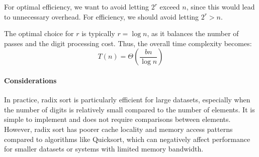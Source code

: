 For optimal efficiency, we want to avoid letting $2^r$ exceed $n$, since this would lead to unnecessary overhead.
For efficiency, we should avoid letting $2^r>n$.

The optimal choice for $r$ is typically $r=\log n$, as it balances the number of passes and the digit processing cost.
Thus, the overall time complexity becomes:
\[T(n)=\Theta\left(\dfrac{bn}{\log n}\right)\]

\paragraph*{Considerations}
In practice, radix sort is particularly efficient for large datasets, especially when the number of digits is relatively small compared to the number of elements. 
It is simple to implement and does not require comparisons between elements. 
However, radix sort has poorer cache locality and memory access patterns compared to algorithms like Quicksort, which can negatively affect performance for smaller datasets or systems with limited memory bandwidth.
